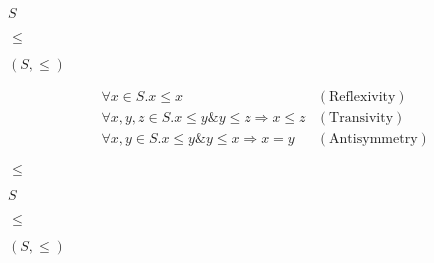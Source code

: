 \documentclass[10pt]{book}
\begin{document}
\begin{mdSnippets}
\newcommand{\downsetlattice}[1]{\mathcal{O}(#1)}
\newcommand{\downX}[1]{\downarrow #1}
\newcommand{\powerset}[1]{\mathbb{P}(#1)}
\newcommand{\dual}[1]{{#1^{\mathrm{op}}}}
\newcommand{\defset}[2]{\{#1 \mid #2\}}
\newcommand{\maxel}{\mathrm{Max}}
\newcommand{\minel}{\mathrm{Min}}

\begin{mdInlineSnippet}%
$S$\end{mdInlineSnippet}%
\begin{mdInlineSnippet}%
$\leq$\end{mdInlineSnippet}%
\begin{mdInlineSnippet}%
$(S, \leq)$\end{mdInlineSnippet}%
\begin{mdDisplaySnippet}%
\[%
\begin{aligned}
    &\forall x \in S. x \leq x &(\mathrm{Reflexivity})\\
    &\forall x, y, z \in S. x \leq y \& y \leq z \Rightarrow x \leq z &(\mathrm{Transivity})\\
    &\forall x, y \in S. x \leq y \& y \leq x \Rightarrow x = y &(\mathrm{Antisymmetry})
\end{aligned}
\]%
\end{mdDisplaySnippet}%
\begin{mdInlineSnippet}%
$\leq$\end{mdInlineSnippet}%
\begin{mdInlineSnippet}%
$S$\end{mdInlineSnippet}%
\begin{mdInlineSnippet}%
$\leq$\end{mdInlineSnippet}%
\begin{mdInlineSnippet}%
$(S, \leq)$\end{mdInlineSnippet}%

\end{mdSnippets}
\end{document}
